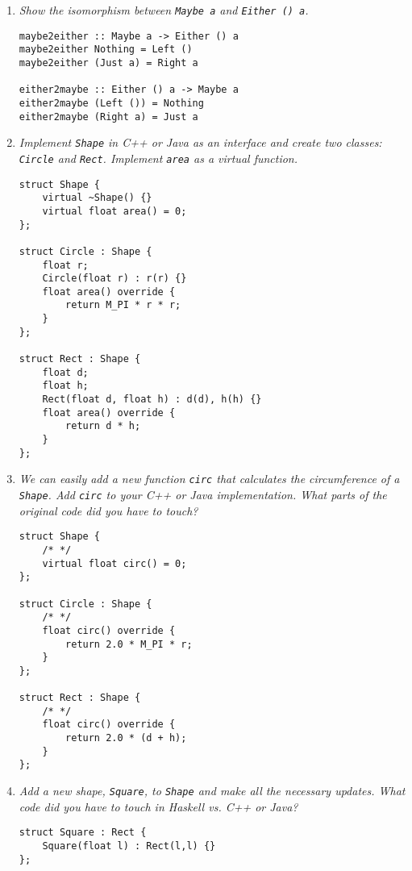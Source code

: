 \documentclass[11pt]{article}
\begin{document}
\begin{enumerate}
\item \textit{Show the isomorphism between \texttt{Maybe a} and \texttt{Either () a}.}

\begin{lstlisting}
maybe2either :: Maybe a -> Either () a
maybe2either Nothing = Left ()
maybe2either (Just a) = Right a

either2maybe :: Either () a -> Maybe a
either2maybe (Left ()) = Nothing
either2maybe (Right a) = Just a
\end{lstlisting}

\item \textit{Implement \texttt{Shape} in C++ or Java as an interface and create two classes: \texttt{Circle} and \texttt{Rect}. Implement \texttt{area} as a virtual function.}

\begin{lstlisting}
struct Shape {
	virtual ~Shape() {}
	virtual float area() = 0;
};

struct Circle : Shape {
	float r;
	Circle(float r) : r(r) {}
	float area() override {
		return M_PI * r * r;
	}
};

struct Rect : Shape {
	float d;
	float h;
	Rect(float d, float h) : d(d), h(h) {}
	float area() override {
		return d * h;
	}
};
\end{lstlisting}

\item \textit{We can easily add a new function \texttt{circ} that calculates the circumference of a \texttt{Shape}. Add \texttt{circ} to your C++ or Java implementation. What parts of the original code did you have to touch?}

\begin{lstlisting}
struct Shape {
	/* */
	virtual float circ() = 0;
};

struct Circle : Shape {
	/* */
	float circ() override {
		return 2.0 * M_PI * r;
	}
};

struct Rect : Shape {
	/* */
	float circ() override {
		return 2.0 * (d + h);
	}
};
\end{lstlisting}

\item \textit{Add a new shape, \texttt{Square}, to \texttt{Shape} and make all the necessary updates. What code did you have to touch in Haskell vs. C++ or Java?}

\begin{lstlisting}
struct Square : Rect {
	Square(float l) : Rect(l,l) {}
};
\end{lstlisting}


\end{enumerate}
\end{document}

